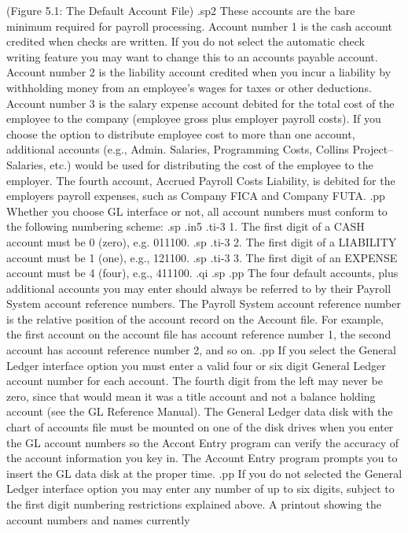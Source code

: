 	      (Figure 5.1:  The Default Account File)
.sp2
These accounts are the bare minimum required for payroll processing.
Account number 1 is the cash account credited when checks are written.
If you do not select the automatic check writing feature you may want
to change this to an accounts payable account.	Account number 2 is the
liability account credited when you incur a liability by withholding money
from an employee's wages for taxes or other deductions.  Account number
3 is the salary expense account debited for the total cost of the
employee to the company (employee gross plus employer payroll costs).
If you choose the option to distribute employee cost to more than one
account, additional accounts (e.g., Admin. Salaries, Programming Costs,
Collins Project--Salaries, etc.) would be used for distributing
the cost of the employee to the employer.   The fourth account, Accrued Payroll
Costs Liability, is debited for the employers
payroll expenses, such as Company
FICA and Company FUTA.
.pp
Whether you choose GL interface or not, all account numbers must conform
to the following numbering scheme:
.sp
.in5
.ti-3
1. The first digit of a CASH account must be 0 (zero), e.g. 011100.
.sp
.ti-3
2. The first digit of a LIABILITY account must be 1 (one), e.g., 121100.
.sp
.ti-3
3. The first digit of an EXPENSE account must be 4 (four), e.g., 411100.
.qi
.sp
.pp
The four default accounts, plus additional accounts
you may enter should always be
referred to by their Payroll System account reference numbers.	The Payroll
System account reference number is the relative position of the account
record on the Account file.  For example, the first
account on the account file has account reference number 1,
the second account has account reference number 2, and so on.
.pp
If you select
the General Ledger interface option you must enter a valid four or
six digit General Ledger account number for each account. The fourth digit
from the left may never be zero, since that would mean it was a title
account and not a balance holding account (see the GL Reference Manual).
The General
Ledger data disk with the chart of accounts file must be mounted on one
of the disk drives when you enter the GL account numbers so the Accont Entry
program can verify the accuracy of the account information you key in.
The Account Entry program prompts you to insert the GL data disk at
the proper time.
.pp
If you do not
selected the General Ledger interface option you may enter any number of up to
six digits, subject to the first digit numbering restrictions explained above.
A printout showing the account numbers and names currently

